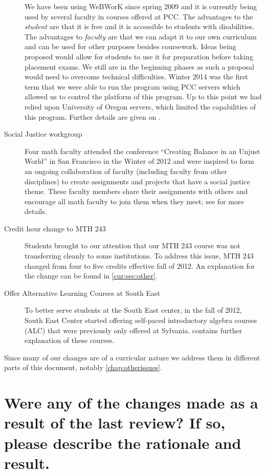 \begin{description}
    We have been using WeBWorK since spring 2009 and it is currently being used by several faculty in courses
    offered at PCC.  The advantages to the \emph{student} are that it is free and it is
    accessible to students with disabilities.   The advantages to \emph{faculty} are that
    we can adapt it to our own curriculum and can be used for other purposes
    besides coursework.   Ideas being proposed would allow for students to
    use it for preparation before taking placement exams.  We still are in the
    beginning phases as such a proposal would need to overcome technical
    difficulties.   Winter 2014 was the first term that we were able to
    run the program using PCC servers which allowed us to control the platform
    of this program.  Up to this point we had relied upon University of Oregon
    servers, which limited the capabilities of this program. Further details 
    are given on .
  \item[Social Justice workgroup] Four math faculty attended the conference
    ``Creating Balance in an Unjust World'' in San Francisco in the Winter of 2012
    and were inspired to form an ongoing collaboration of faculty (including faculty from other disciplines) to create
    assignments and projects that have a social justice theme.  These faculty
    members share their assignments with others and encourage all math faculty
    to join them when they meet; see  for 
    more details.
  \item[Credit hour change to MTH 243] Students brought to our attention that our
    MTH 243 course was not transferring cleanly to some institutions.  To
    address this issue, MTH 243 changed from four to five credits effective fall
    of 2012.  An explanation for the change can be found in \vref{cur:sec:other}.
  \item[Offer Alternative Learning Courses at South East] To better serve students at the South
    East center, in the fall of 2012, South East Center started offering
    self-paced introductory algebra courses (ALC) that were previously only offered at
    Sylvania.  
    contains further explanation of these courses. 
\end{description}
Since many of our changes are of a curricular nature we address them in
different parts of this document, notably \vref{chap:otherissues}.


\section{Were any of the changes made as a result of the last review? If so,
please describe the rationale and result.}\label{over:sec:changesresult}

